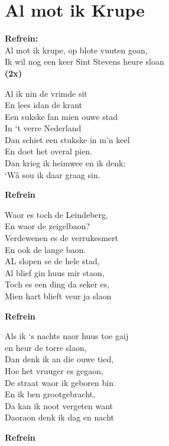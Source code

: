 \section{Al mot ik Krupe}
\textbf{Refrein:}\\
Al mot ik krupe, op blote vuuten goan,\\
Ik wil nog een keer Sint Stevens heure sloan\\
\textbf{(2x)}

Al ik nin de vrimde sit\\
En lees idan de krant\\
Een sukske fan mien ouwe stad\\
In ‘t verre Nederland\\
Dan schiet een stukske in m’n keel\\
 En doet het overal pien.\\
Dan krieg ik heimwee en ik denk:\\
‘Wâ sou ik daar graag sin.

\textbf{Refrein}

Waor es toch de Leindeberg,\\
En waor de zeigelbaon?\\
Verdewenen es de verrukesmert\\
En ook de lange baon.\\
AL slopen se de hele stad,\\
Al blief gin huus mir staon,\\
Toch es een ding da seker es,\\
Mien hart blieft veur ja slaon

\textbf{Refrein}

Als ik ‘s nachts naor huus toe gaij\\
en heur de torre slaon,\\
Dan denk ik an die ouwe tied,\\
Hoe het vruuger es gegaon,\\
De straat waor ik geboren bin\\
En ik ben grootgebracht,\\
Da kan ik noot vergeten want\\
Daoraon denk ik dag en nacht

\textbf{Refrein}
